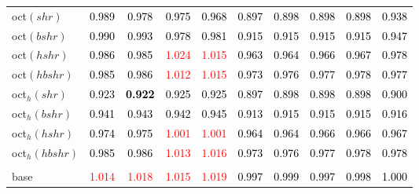 \begin{tabular}[t]{l|ccccccccc}
oct$(shr)$ & \textcolor{black}{0.989} & \textcolor{black}{0.978} & \textcolor{black}{0.975} & \textcolor{black}{0.968} & \textcolor{black}{0.897} & \textcolor{black}{0.898} & \textcolor{black}{0.898} & \textcolor{black}{0.898} & \textcolor{black}{0.938}\\
oct$(bshr)$ & \textcolor{black}{0.990} & \textcolor{black}{0.993} & \textcolor{black}{0.978} & \textcolor{black}{0.981} & \textcolor{black}{0.915} & \textcolor{black}{0.915} & \textcolor{black}{0.915} & \textcolor{black}{0.915} & \textcolor{black}{0.947}\\
oct$(hshr)$ & \textcolor{black}{0.986} & \textcolor{black}{0.985} & \textcolor{red}{1.024} & \textcolor{red}{1.015} & \textcolor{black}{0.963} & \textcolor{black}{0.964} & \textcolor{black}{0.966} & \textcolor{black}{0.967} & \textcolor{black}{0.978}\\
oct$(hbshr)$ & \textcolor{black}{0.985} & \textcolor{black}{0.986} & \textcolor{red}{1.012} & \textcolor{red}{1.015} & \textcolor{black}{0.973} & \textcolor{black}{0.976} & \textcolor{black}{0.977} & \textcolor{black}{0.978} & \textcolor{black}{0.977}\\
oct$_h(shr)$ & \textcolor{black}{0.923} & \textcolor{black}{\textbf{0.922}} & \textcolor{black}{0.925} & \textcolor{black}{0.925} & \textcolor{black}{0.897} & \textcolor{black}{0.898} & \textcolor{black}{0.898} & \textcolor{black}{0.898} & \textcolor{black}{0.900}\\
oct$_h(bshr)$ & \textcolor{black}{0.941} & \textcolor{black}{0.943} & \textcolor{black}{0.942} & \textcolor{black}{0.945} & \textcolor{black}{0.913} & \textcolor{black}{0.915} & \textcolor{black}{0.915} & \textcolor{black}{0.915} & \textcolor{black}{0.916}\\
oct$_h(hshr)$ & \textcolor{black}{0.974} & \textcolor{black}{0.975} & \textcolor{red}{1.001} & \textcolor{red}{1.001} & \textcolor{black}{0.964} & \textcolor{black}{0.964} & \textcolor{black}{0.966} & \textcolor{black}{0.966} & \textcolor{black}{0.967}\\
oct$_h(hbshr)$ & \textcolor{black}{0.985} & \textcolor{black}{0.986} & \textcolor{red}{1.013} & \textcolor{red}{1.016} & \textcolor{black}{0.973} & \textcolor{black}{0.976} & \textcolor{black}{0.977} & \textcolor{black}{0.978} & \textcolor{black}{0.978}\\
\addlinespace[0.3em]
\multicolumn{10}{c}{\textbf{$k = 1$}}\\
base & \textcolor{red}{1.014} & \textcolor{red}{1.018} & \textcolor{red}{1.015} & \textcolor{red}{1.019} & \textcolor{black}{0.997} & \textcolor{black}{0.999} & \textcolor{black}{0.997} & \textcolor{black}{0.998} & \textcolor{black}{1.000}\\

\end{tabular}
